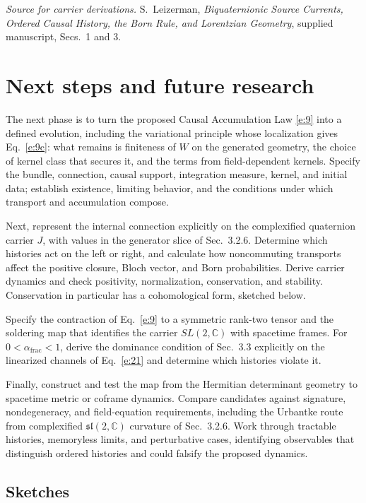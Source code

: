 \documentclass[10pt]{article}
\newcommand{\afrac}{\alpha_{\mathrm{frac}}}
\begin{document}
\medskip
\noindent\textit{Source for carrier derivations.} S.~Leizerman, \textit{Biquaternionic Source Currents, Ordered Causal History, the Born Rule, and Lorentzian Geometry}, supplied manuscript, Secs.~1 and 3.

\section{Next steps and future research}

The next phase is to turn the proposed Causal Accumulation Law \eqref{e:9} into a defined evolution, including the variational principle whose localization gives Eq.~\eqref{e:9c}: what remains is finiteness of $W$ on the generated geometry, the choice of kernel class that secures it, and the terms from field-dependent kernels. Specify the bundle, connection, causal support, integration measure, kernel, and initial data; establish existence, limiting behavior, and the conditions under which transport and accumulation compose.

Next, represent the internal connection explicitly on the complexified quaternion carrier $J$, with values in the generator slice of Sec.~3.2.6. Determine which histories act on the left or right, and calculate how noncommuting transports affect the positive closure, Bloch vector, and Born probabilities. Derive carrier dynamics and check positivity, normalization, conservation, and stability. Conservation in particular has a cohomological form, sketched below.

Specify the contraction of Eq.~\eqref{e:9} to a symmetric rank-two tensor and the soldering map that identifies the carrier $SL(2,\mathbb C)$ with spacetime frames. For $0<\afrac<1$, derive the dominance condition of Sec.~3.3 explicitly on the linearized channels of Eq.~\eqref{e:21} and determine which histories violate it.\par
Finally, construct and test the map from the Hermitian determinant geometry to spacetime metric or coframe dynamics. Compare candidates against signature, nondegeneracy, and field-equation requirements, including the Urbantke route from complexified $\mathfrak{sl}(2,\mathbb C)$ curvature of Sec.~3.2.6. Work through tractable histories, memoryless limits, and perturbative cases, identifying observables that distinguish ordered histories and could falsify the proposed dynamics.

\subsection*{Sketches}
\end{document}

